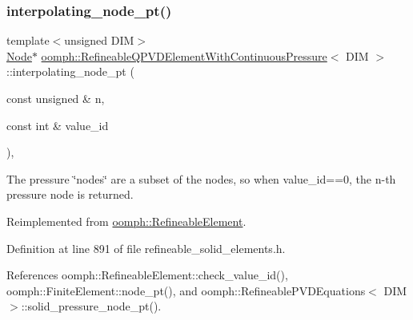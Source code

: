 \subsubsection{\texorpdfstring{interpolating\+\_\+node\+\_\+pt()}{interpolating\_node\_pt()}}
{\footnotesize\ttfamily template$<$unsigned D\+IM$>$ \\
\hyperlink{classoomph_1_1Node}{Node}$\ast$ \hyperlink{classoomph_1_1RefineableQPVDElementWithContinuousPressure}{oomph\+::\+Refineable\+Q\+P\+V\+D\+Element\+With\+Continuous\+Pressure}$<$ D\+IM $>$\+::interpolating\+\_\+node\+\_\+pt (\begin{DoxyParamCaption}\item[{const unsigned \&}]{n,  }\item[{const int \&}]{value\+\_\+id }\end{DoxyParamCaption})\hspace{0.3cm}{\ttfamily [inline]}, {\ttfamily [virtual]}}



The pressure \char`\"{}nodes\char`\"{} are a subset of the nodes, so when value\+\_\+id==0, the n-\/th pressure node is returned. 



Reimplemented from \hyperlink{classoomph_1_1RefineableElement_ab27986fc2f6033a4758662cde78a7b76}{oomph\+::\+Refineable\+Element}.



Definition at line 891 of file refineable\+\_\+solid\+\_\+elements.\+h.



References oomph\+::\+Refineable\+Element\+::check\+\_\+value\+\_\+id(), oomph\+::\+Finite\+Element\+::node\+\_\+pt(), and oomph\+::\+Refineable\+P\+V\+D\+Equations$<$ D\+I\+M $>$\+::solid\+\_\+pressure\+\_\+node\+\_\+pt().

\mbox{\label{classoomph_1_1RefineableQPVDElementWithContinuousPressure_a02fc56894e2c1157f6a081ca42954650}} 
